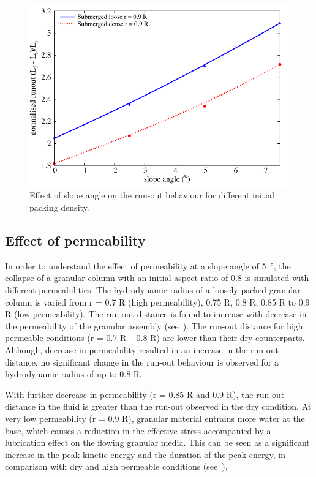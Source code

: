 \begin{figure}
\centering
\includegraphics[width=0.97\columnwidth]{slope_runout}
\caption{Effect of slope angle on the run-out behaviour for different initial 
packing density.}
\label{fig:slope_runout}
\end{figure}

\clearpage
\subsection{Effect of permeability}

In order to understand the effect of permeability at a slope angle of 
\SI{5}{\degree}, the collapse of a granular column with an initial aspect ratio 
of 0.8 is simulated with different permeabilities. The hydrodynamic radius of 
a loosely packed granular column is varied from r = 0.7 R (high permeability), 
0.75 R, 0.8 R, 0.85 R to 0.9 R (low permeability). The run-out distance is 
found to increase with decrease in the permeability of the granular assembly 
(see~). The run-out distance for high permeable conditions (r = 
0.7 R -- 0.8 R) are lower than their dry counterparts. Although, decrease in 
permeability resulted in an increase in the run-out distance, no significant 
change in the run-out behaviour is observed for a hydrodynamic radius of up to 
0.8 R.

With further decrease in permeability (r = 0.85 R and 0.9 R), the run-out 
distance in the fluid is greater than the run-out observed in the dry 
condition. At very low permeability (r = 0.9 R), granular material
entrains more water at the base, which causes a reduction in the effective 
stress accompanied by a lubrication effect on the flowing granular media. This 
can be seen as a significant increase in the peak kinetic energy and the 
duration of the peak energy, in comparison with dry and high permeable 
conditions (see~).

